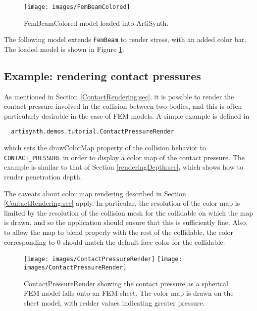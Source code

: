 \begin{figure}[ht]
	\centering
	\texttt{[image: images/FemBeamColored]}
	\caption{FemBeamColored model loaded into ArtiSynth.}
	\label{fig:fem:beamcolored}
\end{figure}

The following model extends {\tt FemBeam} to render stress, with an added 
color bar.  The loaded model is shown in Figure \ref{fig:fem:beamcolored}.
\lstset{numbers=left}

\lstset{numbers=none}

\subsection{Example: rendering contact pressures}
\label{renderingContactPressure:sec}

As mentioned in Section \ref{ContactRendering:sec}, it is possible to
render the contact pressure involved in the collision between two
bodies, and this is often particularly desirable in the case of FEM
models. A simple example is defined in
%
\begin{verbatim}
  artisynth.demos.tutorial.ContactPressureRender
\end{verbatim}
%
which sets the {\sf drawColorMap} property of the collision behavior to {\tt
CONTACT\_PRESSURE} in order to display a color map of the contact
pressure. The example is similar to that
of Section \ref{renderingDepth:sec}, which shows how to render
penetration depth.

\begin{sideblock}
The caveats about color map rendering described in Section
\ref{ContactRendering:sec} apply. In particular, the resolution of the
color map is limited by the resolution of the collision mesh for the
collidable on which the map is drawn, and so the application should
ensure that this is sufficiently fine. Also, to allow the map to blend
properly with the rest of the collidable, the color corresponding to
$0$ should match the default face color for the collidable.
\end{sideblock}

\begin{figure}[ht]
\begin{center}
\iflatexml
 \texttt{[image: images/ContactPressureRender]}
\else
 \texttt{[image: images/ContactPressureRender]}
\fi
\end{center}
\caption{ContactPressureRender showing the contact pressure as a
spherical FEM model falls onto an FEM sheet.  The color map is drawn
on the sheet model, with redder values indicating greater pressure.}
\label{ContactPressureRender:fig}
\end{figure}

